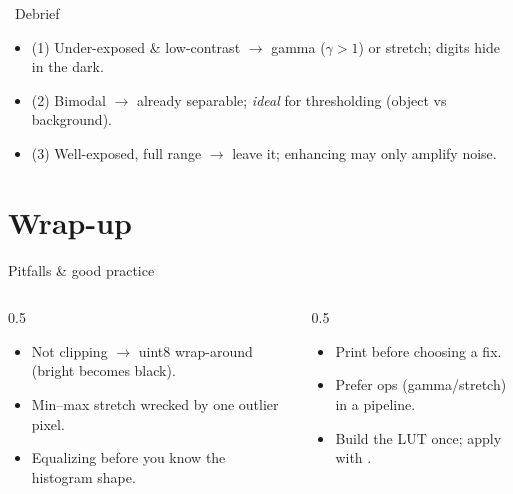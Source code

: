 \documentclass[10pt,aspectratio=169]{beamer}
\begin{document}
\begin{frame}{\faPen~Debrief}
  \begin{itemize}
    \item (1) Under-exposed \& low-contrast $\rightarrow$ gamma ($\gamma>1$) or stretch; digits hide in the dark.
    \item (2) Bimodal $\rightarrow$ already separable; \emph{ideal} for thresholding (object vs background).
    \item (3) Well-exposed, full range $\rightarrow$ leave it; enhancing may only amplify noise.
  \end{itemize}
\end{frame}

\section{Wrap-up}

\begin{frame}{Pitfalls \& good practice}
  \begin{columns}[T]
    \begin{column}{0.5\textwidth}
      \begin{badbox}
        \begin{itemize}
          \item Not clipping $\rightarrow$ uint8 wrap-around (bright becomes black).
          \item Min--max stretch wrecked by one outlier pixel.
          \item Equalizing before you know the histogram shape.
        \end{itemize}
      \end{badbox}
    \end{column}
    \begin{column}{0.5\textwidth}
      \begin{goodbox}
        \begin{itemize}
          \item Print  before choosing a fix.
          \item Prefer  ops (gamma/stretch) in a pipeline.
          \item Build the LUT once; apply with .
        \end{itemize}
      \end{goodbox}
    \end{column}
  \end{columns}
\end{frame}
\end{document}
